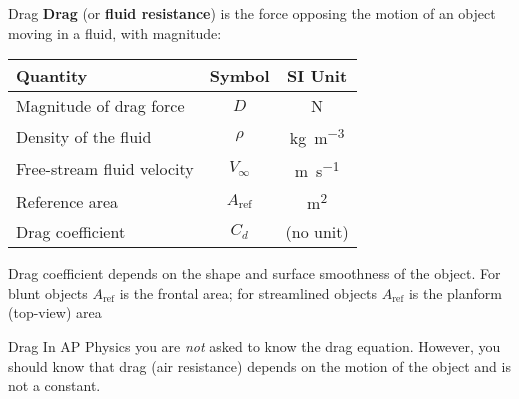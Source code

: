\documentclass[12pt,compress,aspectratio=169]{beamer}
\newcommand{\eq}[2]{\vspace{#1}{\Large\begin{displaymath}#2\end{displaymath}}}
\begin{document}
\begin{frame}{Drag}
  \textbf{Drag} (or \textbf{fluid resistance}) is the force opposing the
  motion of an object moving in a fluid, with magnitude:

  \eq{-.2in}{
    D=\frac12\rho V_\infty^2A_\mathrm{ref}C_d
  }  
  \begin{center}
    \begin{tabular}{l|c|c}
      \rowcolor{pink}
      \textbf{Quantity} & \textbf{Symbol} & \textbf{SI Unit} \\ \hline
      Magnitude of drag force & $D$  & \si{\newton}\\
      Density of the fluid & $\rho$ & \si{\kilo\gram\per\metre\cubed}\\
      Free-stream fluid velocity & $V_\infty$ & \si{\metre\per\second}\\
      Reference area   & $A_\mathrm{ref}$ & \si{\metre\squared}\\
      Drag coefficient & $C_d$ & (no unit)
    \end{tabular}
  \end{center}
  {\footnotesize Drag coefficient depends on the shape and surface smoothness
    of the object. For blunt objects $A_\mathrm{ref}$ is the frontal area; for
    streamlined objects $A_\mathrm{ref}$ is the planform (top-view) area\par}
\end{frame}



\begin{frame}{Drag}
  In AP Physics you are \emph{not} asked to know the drag equation. However,
  you should know that drag (air resistance) depends on the motion of the
  object and is not a constant.
\end{frame}
\end{document}
